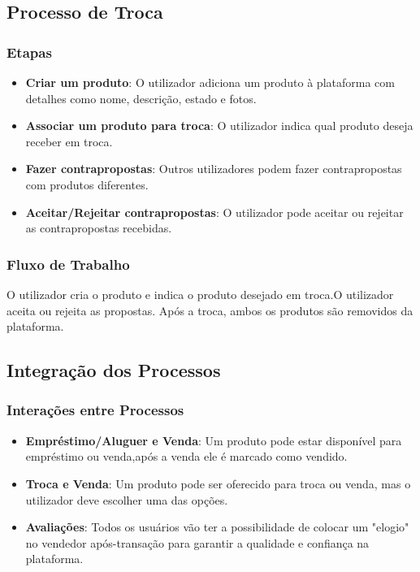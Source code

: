 \documentclass[a4paper, 12pt]{article} %
\begin{document}
\subsection{Processo de Troca}

\subsubsection{Etapas}
\begin{itemize}
	\item \textbf{Criar um produto}: O utilizador adiciona um produto à plataforma com detalhes como nome, descrição, estado e fotos.
	\item \textbf{Associar um produto para troca}: O utilizador indica qual produto deseja receber em troca.
	\item \textbf{Fazer contrapropostas}: Outros utilizadores podem fazer contrapropostas com produtos diferentes.
	\item \textbf{Aceitar/Rejeitar contrapropostas}: O utilizador pode aceitar ou rejeitar as contrapropostas recebidas.
\end{itemize}

\subsubsection{Fluxo de Trabalho}
O utilizador cria o produto e indica o produto desejado em troca.O utilizador aceita ou rejeita as propostas. Após a troca, ambos os produtos são removidos da plataforma.

\subsection{Integração dos Processos}

\subsubsection{Interações entre Processos}
\begin{itemize}
	\item \textbf{Empréstimo/Aluguer e Venda}: Um produto pode estar disponível para empréstimo ou venda,após a venda ele é marcado como vendido.
	\item \textbf{Troca e Venda}: Um produto pode ser oferecido para troca ou venda, mas o utilizador deve escolher uma das opções.
	\item \textbf{Avaliações}: Todos os usuários vão ter a possibilidade de colocar um "elogio" no vendedor após-transação para garantir a qualidade e confiança na plataforma. 
\end{itemize}
\end{document}
